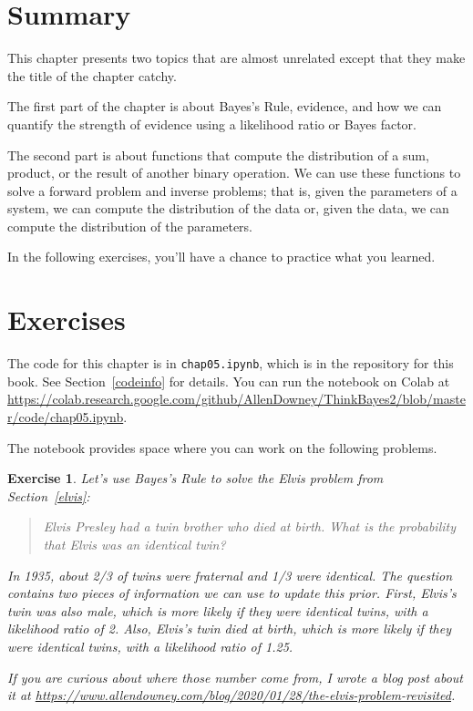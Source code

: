 \documentclass[12pt]{book}
\theoremstyle{exercise}
\newtheorem{exercise}{Exercise}[chapter]
\newcommand{\py}[1]{{\tt #1}}%
\begin{document}
\section{Summary}

This chapter presents two topics that are almost unrelated except that they make the title of the chapter catchy.

The first part of the chapter is about Bayes's Rule, evidence, and how we can quantify the strength of evidence using a likelihood ratio or Bayes factor.

The second part is about functions that compute the distribution of a sum, product, or the result of another binary operation.
We can use these functions to solve a forward problem and inverse problems; that is, given the parameters of a system, we can compute the distribution of the data or, given the data, we can compute the distribution of the parameters.

In the following exercises, you'll have a chance to practice what you learned.


\section{Exercises}

The code for this chapter is in \py{chap05.ipynb}, which is in the repository for this book.  See Section~\ref{codeinfo} for details.
You can run the notebook on Colab at \url{https://colab.research.google.com/github/AllenDowney/ThinkBayes2/blob/master/code/chap05.ipynb}.

The notebook provides space where you can work on the following problems.


\begin{exercise}
Let's use Bayes's Rule to solve the Elvis problem from Section~\ref{elvis}:

\begin{quote}
Elvis Presley had a twin brother who died at birth. What is the probability that Elvis was an identical twin?
\end{quote}

In 1935, about 2/3 of twins were fraternal and 1/3 were identical.
The question contains two pieces of information we can use to update this prior.
First, Elvis's twin was also male, which is more likely if they were identical twins, with a likelihood ratio of 2.
Also, Elvis's twin died at birth, which is more likely if they were identical twins, with a likelihood ratio of 1.25.

If you are curious about where those number come from, I wrote a blog post about it at \url{https://www.allendowney.com/blog/2020/01/28/the-elvis-problem-revisited}.
\end{exercise}
\end{document}

